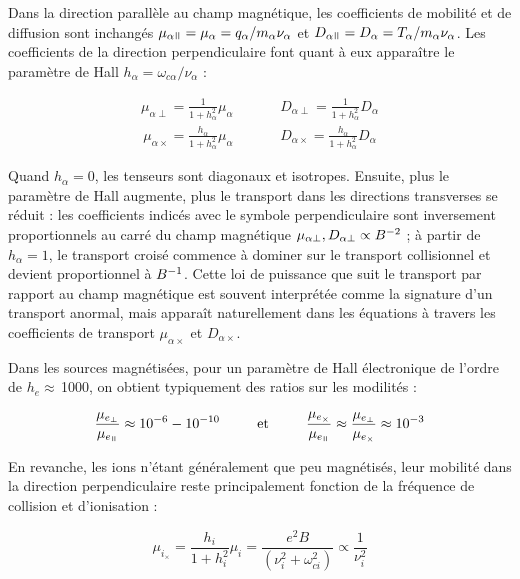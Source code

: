 \begin{refsection}
Dans la direction parallèle au champ magnétique, les coefficients de mobilité et
de diffusion sont inchangés
$\mu_{\alpha\para}=\mu_{\alpha}=q_\alpha/m_\alpha\nu_\alpha$ et
$D_{\alpha\para}=D_\alpha=T_\alpha/m_\alpha\nu_\alpha$. Les coefficients de la
direction perpendiculaire font quant à eux apparaître le paramètre de Hall
$h_\alpha=\omega_{c\alpha}/\nu_\alpha$ :

\begin{align}
\mu_{\alpha\perp}=\frac{1}{1+h_\alpha^2}\mu_\alpha\;\;\;\;\;\;\;\;
\;\;\;\;D_{\alpha\perp}=\frac{1}{1+h_\alpha^2}D_\alpha
\end{align}
\begin{align}
\mu_{\alpha\times}=\frac{h_\alpha}{1+h_\alpha^2}\mu_\alpha\;\;\;\;
\;\;\;\;\;\;\;\;D_{\alpha\times}=\frac{h_\alpha}{1+h_\alpha^2}D_\alpha
\end{align}

Quand $h_\alpha=0$, les tenseurs sont diagonaux et isotropes. Ensuite, plus le
paramètre de Hall augmente, plus le transport dans les directions transverses se
réduit :
les coefficients indicés avec le symbole perpendiculaire sont inversement
proportionnels au carré du champ magnétique $\mu_{\alpha\perp},
D_{\alpha\perp}\propto B^{{-2}}$ ; à partir de $h_\alpha=1$, le
transport croisé commence à dominer sur le transport collisionnel et devient proportionnel à
$B^{{-1}}$. Cette loi de puissance que suit le transport par rapport au
champ magnétique est souvent interprétée comme la signature d'un transport
anormal, mais apparaît naturellement dans les équations à travers les
coefficients de transport $\mu_{\alpha\times}$ et $D_{\alpha\times}$.

Dans les sources magnétisées, pour un paramètre de Hall électronique de l'ordre
de $h_e\approx\,$1000, on obtient typiquement des ratios sur les modilités :

\begin{equation}
\frac{\mu_{e_\perp}}{\mu_{e_\para}}\approx
10^{-6}-10^{-10}\text{~~~~~~~~et~~~~~~~~}\frac{\mu_{e_\times}}{\mu_{e_\para}}\approx
\frac{\mu_{e_\perp}}{\mu_{e_\times}}\approx10^{-3}
\end{equation}

En revanche, les ions n'étant généralement que peu magnétisés, leur mobilité
dans la direction perpendiculaire reste principalement fonction de la fréquence
de collision et d'ionisation  :

\begin{equation}
\mu_{i_\times}=\frac{h_i}{1+h_i^2}\mu_i=\frac{e^2B}{(\nu_i^2+\omega_{ci}^2)}\propto\frac{1}{\nu_i^2}
\end{equation}


\end{refsection}
